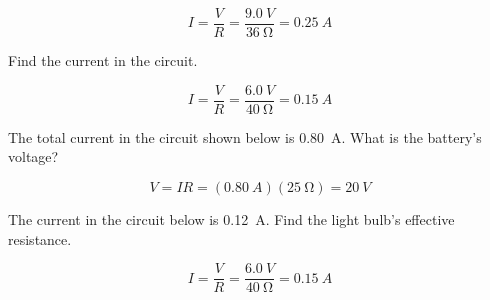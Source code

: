 \documentclass[answers]{exam}
\begin{document}
\begin{questions}
\begin{center}
\begin{solution}
\begin{equation*}
    I = \frac{V}{R} = \frac{\SI{9.0}{V}}{\SI{36}{\ohm}} = \boxed{\SI{0.25}{A}}
\end{equation*}
\end{solution}
\end{center}

\question
Find the current in the circuit.

\begin{center}
\end{center}

\begin{solution}
\begin{equation*}
    I = \frac{V}{R} = \frac{\SI{6.0}{V}}{\SI{40}{\ohm}} = \boxed{\SI{0.15}{A}}
\end{equation*}
\end{solution}

\question
The total current in the circuit shown below is \SI{0.80}{A}. What is the battery's voltage?

\begin{center}
\end{center}

\begin{solution}
\begin{equation*}
    V = IR = (\SI{0.80}{A})(\SI{25}{\ohm}) = \boxed{\SI{20}{V}}
\end{equation*}
\end{solution}

\question
The current in the circuit below is \SI{0.12}{A}. Find the light bulb's effective resistance.

\begin{center}

\begin{solution}
\begin{equation*}
    I = \frac{V}{R} = \frac{\SI{6.0}{V}}{\SI{40}{\ohm}} = \boxed{\SI{0.15}{A}}
\end{equation*}
\end{solution}
\end{center}
\end{questions}
\end{document}

